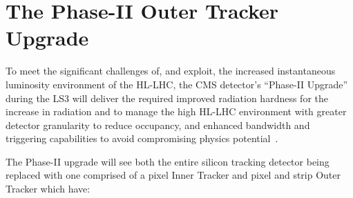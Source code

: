 \section{The Phase-II Outer Tracker Upgrade}\label{sec:tk-upgrade}

To meet the significant challenges of, and exploit, the increased instantaneous luminosity environment of the HL-LHC, the CMS detector's ``Phase-II Upgrade'' during the LS3 will deliver the required improved radiation hardness for the increase in radiation and to manage the high \PU HL-LHC environment with greater detector granularity to reduce occupancy, and enhanced bandwidth and triggering capabilities to avoid compromising physics potential~\cite{CMSCollaboration:2015zni,P2TrackerTDR}.

The Phase-II upgrade will see both the entire silicon tracking detector being replaced with one comprised of a pixel Inner Tracker and pixel and strip Outer Tracker which have:
